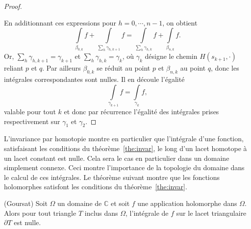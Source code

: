 \begin{proof}
\begin{figure}[H]
\begin{center}
\end{center}
\end{figure}

En additionnant ces expressions pour $h=0,\cdots, n-1$, on obtient
\[\int\limits_{\beta_{0,k}} f  + \int\limits_{\sum_h \gamma_{h,k+1}} f = \int\limits_{\sum_h \gamma_{h,k}} f + \int\limits_{\beta_{n,k}} f.\]
Or, $\sum_h \gamma_{h,k+1} = \gamma_{k+1}$ et $\sum_h \gamma_{h,k} = \gamma_{k}$, où $\gamma_k$ désigne le chemin $H(s_{k+1}, \cdot)$ reliant $p$ et $q$. Par ailleurs $\beta_{0,k}$ se réduit au point $p$ et $\beta_{n,k}$ au point $q$, donc les intégrales correspondantes sont nulles. Il en découle l'égalité
\[ \int\limits_{\gamma_{k+1}} f = \int\limits_{\gamma_{k}} f,\]
valable pour tout $k$ et donc par récurrence l'égalité des intégrales prises respectivement sur $\gamma_1$ et $\gamma_2$.
\end{proof}

L'invariance par homotopie montre en particulier que l'intégrale d'une fonction, satisfaisant les conditions du théorème~\ref{the:invar}, le long d'un lacet homotope à un lacet constant est nulle. Cela sera le cas en particulier dans un domaine simplement connexe. Ceci montre l'importance de la topologie du domaine dans le calcul de ces intégrales. Le théorème suivant montre que les fonctions holomorphes satisfont les conditions du théorème~\ref{the:invar}.

%

\begin{fthm}(Goursat) \label{ThGoursat}
Soit $\Omega$ un domaine de $\mathbb{C}$ et soit $f$ une application holomorphe
dans $\Omega$. Alors pour tout triangle $T$ inclus dans $\Omega$, l'intégrale de 
$f$ sur le lacet triangulaire $\partial T$ est nulle.
\end{fthm}


